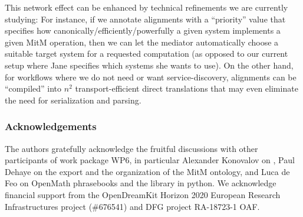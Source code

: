 This network effect can be enhanced by technical refinements we are currently studying:
For instance, if we annotate alignments with a ``priority'' value that specifies how canonically/efficiently/powerfully a given system implements a given MitM operation, then we can let
the \MMT mediator automatically choose a suitable target system for a requested computation (as opposed to our current setup where Jane specifies which systems she wants to use). On the other hand, for workflows where we do not need or want service-discovery, alignments can be ``compiled'' into $n^2$ transport-efficient direct translations that may even eliminate the need for serialization and parsing.

\subsubsection*{Acknowledgements}
The authors gratefully acknowledge the fruitful discussions with other participants of
work package WP6, in particular Alexander Konovalov on \SCSCP, Paul Dehaye on the \Sage
export and the organization of the MitM ontology, and Luca de Feo on OpenMath phrasebooks
and the \SCSCP library in python.  We acknowledge financial support from the OpenDreamKit
Horizon 2020 European Research Infrastructures project (\#676541) and DFG project RA-18723-1 OAF.


